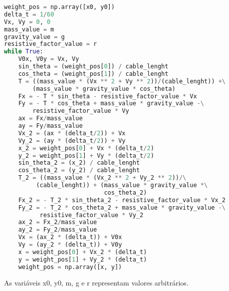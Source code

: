 \documentclass[12pt]{article}
\begin{document}
\begin{lstlisting}[language=Python]
weight_pos = np.array([x0, y0])
delta_t = 1/60
Vx, Vy = 0, 0
mass_value = m
gravity_value = g
resistive_factor_value = r
while True:
    V0x, V0y = Vx, Vy
    sin_theta = (weight_pos[0]) / cable_lenght
    cos_theta = (weight_pos[1]) / cable_lenght
    T = ((mass_value * (Vx ** 2 + Vy ** 2))/(cable_lenght)) +\
        (mass_value * gravity_value * cos_theta)
    Fx = - T * sin_theta - resistive_factor_value * Vx
    Fy = - T * cos_theta + mass_value * gravity_value -\
        resistive_factor_value * Vy
    ax = Fx/mass_value
    ay = Fy/mass_value
    Vx_2 = (ax * (delta_t/2)) + Vx
    Vy_2 = (ay * (delta_t/2)) + Vy
    x_2 = weight_pos[0] + Vx * (delta_t/2)
    y_2 = weight_pos[1] + Vy * (delta_t/2)
    sin_theta_2 = (x_2) / cable_lenght
    cos_theta_2 = (y_2) / cable_lenght
    T_2 = ((mass_value * (Vx_2 ** 2 + Vy_2 ** 2))/\
         (cable_lenght)) + (mass_value * gravity_value *\
                            cos_theta_2)
    Fx_2 = - T_2 * sin_theta_2 - resistive_factor_value * Vx_2
    Fy_2 = - T_2 * cos_theta_2 + mass_value * gravity_value -\
          resistive_factor_value * Vy_2
    ax_2 = Fx_2/mass_value
    ay_2 = Fy_2/mass_value
    Vx = (ax_2 * (delta_t)) + V0x
    Vy = (ay_2 * (delta_t)) + V0y
    x = weight_pos[0] + Vx_2 * (delta_t)
    y = weight_pos[1] + Vy_2 * (delta_t)
    weight_pos = np.array([x, y])
\end{lstlisting}
    As variáveis  x0, y0, m, g e r representam valores arbitrários.
    \newpage
\end{document}
